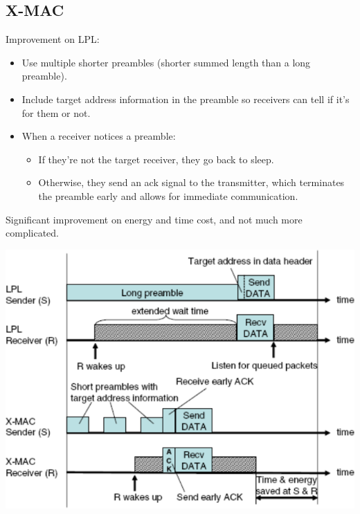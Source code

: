 \documentclass[a4paper, 11pt]{article}
\begin{document}
{    \subsection*{X-MAC}
    {
        \begin{minipage}[t]{0.55\textwidth}
        Improvement on LPL:
        \begin{itemize}
        \item Use multiple shorter preambles (shorter summed length than a long preamble).
        \item Include target address information in the preamble so receivers can tell if it's for them or not.
        \item
        {
            When a receiver notices a preamble:
            \begin{itemize}
            \item If they're not the target receiver, they go back to sleep.
            \item Otherwise, they send an ack signal to the transmitter, which terminates the preamble early and allows for immediate communication.
            \end{itemize}
        }
        \end{itemize}

        Significant improvement on energy and time cost, and not much more complicated.
        \end{minipage}
        \hspace{3mm}
        \begin{minipage}[t]{0.4\textwidth}
        \vspace{0pt}
        \centering
        \includegraphics[width=\textwidth]{xmac.png}
        \end{minipage}
    }
}
\end{document}
